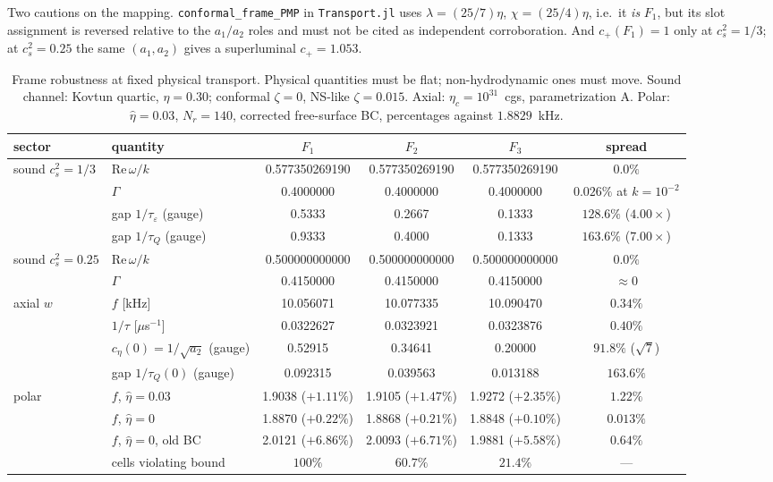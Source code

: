 \documentclass[aps,prd,preprint,amsmath,amssymb,nofootinbib,longbibliography]{revtex4-2}
\newcommand{\cs}{c_s}
\begin{document}
Two cautions on the mapping. \texttt{conformal\_frame\_PMP} in \texttt{Transport.jl} uses
$\lambda = (25/7)\eta$, $\chi = (25/4)\eta$, i.e.\ it \emph{is} $F_1$, but its slot assignment
is reversed relative to the $a_1/a_2$ roles and must not be cited as independent corroboration.
And $c_+(F_1) = 1$ only at $\cs^2 = 1/3$; at $\cs^2 = 0.25$ the same $(a_1,a_2)$ gives a
superluminal $c_+ = 1.053$.

\begin{table}[htbp]
\caption{Frame robustness at fixed physical transport. Physical quantities must be flat;
non-hydrodynamic ones must move. Sound channel: Kovtun quartic, $\eta = 0.30$; conformal
$\zeta = 0$, NS-like $\zeta = 0.015$. Axial: $\eta_c = 10^{31}$~cgs, parametrization A. Polar:
$\hat\eta = 0.03$, $N_r = 140$, corrected free-surface BC, percentages against $1.8829$~kHz.}
\label{tab:robust}
\scriptsize
\begin{ruledtabular}
\begin{tabular}{llcccc}
sector & quantity & $F_1$ & $F_2$ & $F_3$ & spread\\
\hline
sound $\cs^2{=}1/3$ & $\mathrm{Re}\,\omega/k$ & 0.577350269190 & 0.577350269190 & 0.577350269190 & $0.0\%$\\
 & $\Gamma$ & 0.4000000 & 0.4000000 & 0.4000000 & $0.026\%$ at $k=10^{-2}$\\
 & gap $1/\tau_\varepsilon$ (gauge) & 0.5333 & 0.2667 & 0.1333 & $128.6\%$ ($4.00\times$)\\
 & gap $1/\tau_Q$ (gauge) & 0.9333 & 0.4000 & 0.1333 & $163.6\%$ ($7.00\times$)\\
sound $\cs^2{=}0.25$ & $\mathrm{Re}\,\omega/k$ & 0.500000000000 & 0.500000000000 & 0.500000000000 & $0.0\%$\\
 & $\Gamma$ & 0.4150000 & 0.4150000 & 0.4150000 & $\approx0$\\
axial $w$ & $f$ [kHz] & 10.056071 & 10.077335 & 10.090470 & $0.34\%$\\
 & $1/\tau$ [$\mu$s$^{-1}$] & 0.0322627 & 0.0323921 & 0.0323876 & $0.40\%$\\
 & $c_\eta(0) = 1/\sqrt{a_2}$ (gauge) & 0.52915 & 0.34641 & 0.20000 & $91.8\%$ ($\sqrt7$)\\
 & gap $1/\tau_Q(0)$ (gauge) & 0.092315 & 0.039563 & 0.013188 & $163.6\%$\\
polar & $f$, $\hat\eta{=}0.03$ & 1.9038 ($+1.11\%$) & 1.9105 ($+1.47\%$) & 1.9272 ($+2.35\%$) & $1.22\%$\\
 & $f$, $\hat\eta=0$ & 1.8870 ($+0.22\%$) & 1.8868 ($+0.21\%$) & 1.8848 ($+0.10\%$) & $0.013\%$\\
 & $f$, $\hat\eta{=}0$, old BC & 2.0121 ($+6.86\%$) & 2.0093 ($+6.71\%$) & 1.9881 ($+5.58\%$) & $0.64\%$\\
 & cells violating bound & $100\%$ & $60.7\%$ & $21.4\%$ & ---\\
\end{tabular}
\end{ruledtabular}
\end{table}
\end{document}
